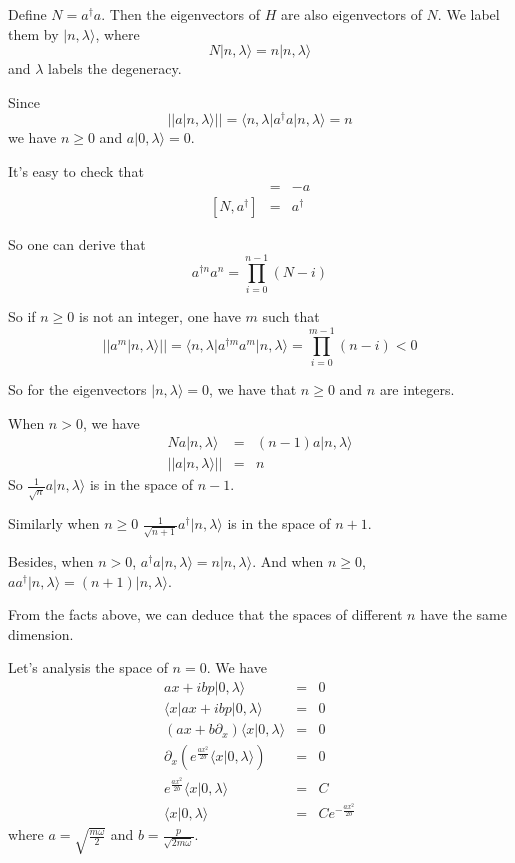 \documentclass[12pt]{book}
\begin{document}
	Define $N=a^\dagger a$. Then the eigenvectors of $H$ are also eigenvectors of $N$. We label them by $|n,\lambda\rangle$, where
	\begin{equation}
		N|n,\lambda\rangle=n|n,\lambda\rangle
	\end{equation}
	and $\lambda$ labels the degeneracy.
	
	Since 
	\begin{equation}
		||a|n,\lambda\rangle||=\langle n,\lambda|a^\dagger a|n,\lambda\rangle=n
	\end{equation}
	we have $n\geq 0$ and $a|0,\lambda\rangle=0$.
	
	It's easy to check that 
	\begin{eqnarray}
		[N,a]&=&-a\\{}
		[N,a^\dagger]&=&a^\dagger
	\end{eqnarray}
	
	So one can derive that 
	\begin{equation}
		a^{\dagger n}a^n=\prod_{i=0}^{n-1}(N-i)
	\end{equation}
	
	So if $n\geq 0$ is not an integer, one have $m$ such that 
	\begin{equation}
		||a^m|n,\lambda\rangle||=\langle n,\lambda|a^{\dagger m}a^m|n,\lambda\rangle=\prod_{i=0}^{m-1}(n-i)<0
	\end{equation}

	So for the eigenvectors $|n,\lambda\rangle=0$, we have that $n\geq 0$ and $n$ are integers.
	
	When $n>0$, we have
	\begin{eqnarray}
		N a|n,\lambda\rangle&=&(n-1)a|n,\lambda\rangle\\
		||a|n,\lambda\rangle||&=&n
	\end{eqnarray}
	So $\frac 1{\sqrt n}a|n,\lambda\rangle$ is in the space of $n-1$.
	
	Similarly when $n\geq0$ $\frac 1{\sqrt {n+1}}a^\dagger|n,\lambda\rangle$ is in the space of $n+1$.
	
	Besides, when $n>0$, $a^\dagger a|n,\lambda\rangle=n|n,\lambda\rangle$. And when $n\geq 0$, $aa^\dagger|n,\lambda\rangle=(n+1)|n,\lambda\rangle$.
	
	From the facts above, we can deduce that the spaces of different $n$ have the same dimension.
	
	Let's analysis the space of $n=0$. We have
	\begin{eqnarray}
		ax+ibp|0,\lambda\rangle&=&0\\
		\langle x|ax+ibp|0,\lambda\rangle&=&0\\
		(ax+b\partial_x)\langle x|0,\lambda\rangle&=&0\\
		\partial_x(e^{\frac{ax^2}{2b}}\langle x|0,\lambda\rangle)&=&0\\
		e^{\frac{ax^2}{2b}}\langle x|0,\lambda\rangle&=&C\\
		\langle x|0,\lambda\rangle&=&Ce^{-\frac{ax^2}{2b}}
	\end{eqnarray}
	where $a=\sqrt{\frac {m\omega}2}$ and $b=\frac p{\sqrt{2m\omega}}$.
	
\end{document}
